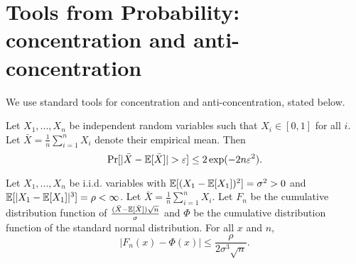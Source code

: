 \section{Tools from Probability: concentration and anti-concentration}
\label{sec:prelim}

We use standard tools for concentration and anti-concentration, stated below.

\begin{theorem}\label{thm:prelims-chernoff}
Let $X_1,...,X_n$  be independent random variables such that $X_i \in [0,1]$ for all $i$. Let $\bar{X} = \frac{1}{n}\sum_{i=1}^n X_i$ denote their empirical mean. Then
\[
\Pr[ |\bar{X} - \mathbb{E}[\bar{X}]| > \varepsilon] \leq 2\exp(-2n\varepsilon^2).
\]
\end{theorem}

\begin{theorem}\label{thm:prelims-Berry}
Let $X_1,...,X_n$ be i.i.d. variables with $\mathbb{E}[ (X_1 - \mathbb{E}[X_1])^2] = \sigma^2 >0$ and $\mathbb{E}[ |X_1 - \mathbb{E}[X_1]|^3] =\rho <\infty$. Let $\bar{X} = \frac{1}{n} \sum_{i=1}^n X_i$. Let $F_n$ be the cumulative distribution function of $\frac{(\bar{X} - \mathbb{E}[\bar{X}]) \sqrt{n}}{\sigma}$ and $\Phi$ be the cumulative distribution function of the standard normal distribution. For all $x$ and $n$,
\[
|F_n(x) - \Phi(x) | \leq \frac{\rho}{2\sigma^3\sqrt{n}}.
\]
\end{theorem}


